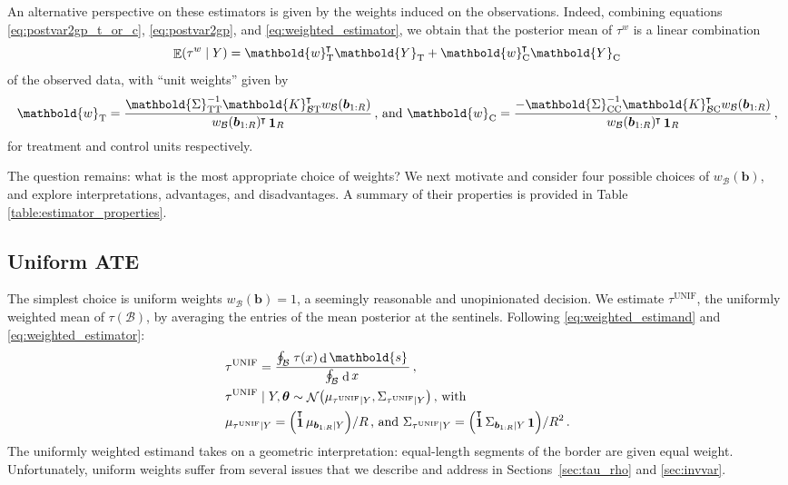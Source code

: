 \documentclass[letter,12pt]{article}
\DeclarePairedDelimiter{\parenthesis}{\lparen}{\rparen}
\newcommand{\del}[1]{\parenthesis*{#1}}
\DeclareMathOperator{\dif}{d}
\DeclareMathOperator{\E}{\mathbb{E}}
\DeclareMathOperator{\normal}{\mathcal{N}}
\DeclareMathOperator{\ones}{\mathbf{1}}
\newcommand*{\trans}{^{\mkern-1.5mu\intercal}}
\newcommand{\treat}{\mathrm{T}}
\newcommand{\ctrol}{\mathrm{C}}
\newcommand{\svec}{\mathbold{s}}
\newcommand{\wvec}{\mathbold{w}}
\newcommand{\Yvec}{\mathbold{Y}}
\newcommand{\yt}{\Yvec_{\treat}}
\newcommand{\yc}{\Yvec_{\ctrol}}
\newcommand{\border}{\mathcal{B}}
\newcommand{\sentinel}{\bm{b}}
\newcommand{\numsent}{R}
\newcommand{\sentinels}{\sentinel_{1:\numsent}}
\newcommand{\tauw}{\tau^{w}}
\newcommand{\unifavg}{\tau^{\mathrm{UNIF}}}
\newcommand{\hyperparam}{\bm{\theta}}
\newcommand{\weightb}{w_{\border}}
\newcommand{\wt}{\wvec_{\treat}}
\newcommand{\wc}{\wvec_{\ctrol}}
\newcommand{\Kmat}{\mathbold{K}}
\newcommand{\SigmaMat}{\mathbold{\Sigma}}
\newcommand{\KBT}{\Kmat_{\border \treat}}
\newcommand{\KBC}{\Kmat_{\border \ctrol}}
\newcommand{\STT}{\SigmaMat_{\treat \treat}}
\newcommand{\SCC}{\SigmaMat_{\ctrol \ctrol}}
\begin{document}
An alternative perspective on these estimators is given by the weights induced on the observations.
Indeed, combining equations \eqref{eq:postvar2gp_t_or_c}, \eqref{eq:postvar2gp}, and \eqref{eq:weighted_estimator}, we obtain that the posterior mean of \(\tauw\) is a linear combination
\begin{equation}
    \E\del{\tauw \mid Y} = \wt\trans \yt + \wc\trans \yc
    \label{eq:unit_weights}
\end{equation}
of the observed data, with ``unit weights'' given by
\begin{equation}
        \wt = \frac{
            \STT^{-1} 
            \KBT\trans \weightb(\sentinels)
        }{
            \weightb(\sentinels)\trans \ones_{\numsent}
        }
        \,\text{, and }
        \wc = \frac{
            -
            \SCC^{-1} 
            \KBC\trans \weightb(\sentinels)
        }{
            \weightb(\sentinels)\trans \ones_{\numsent}
        }
        \,,
    \label{eq:unit_weights_gp}
\end{equation}
for treatment and control units respectively.

The question remains: what is the most appropriate choice of weights? We next motivate and consider four possible choices of \(\weightb(\sentinel)\), and explore interpretations, advantages, and disadvantages. A summary of their properties is provided in Table \ref{table:estimator_properties}.

\hypertarget{uniform-ate}{%
\subsection{Uniform ATE}\label{uniform-ate}}

The simplest choice is uniform weights \(\weightb(\sentinel)=1\), a seemingly reasonable and unopinionated decision.
We estimate \(\unifavg\), the uniformly weighted mean of \(\tau(\border)\), by averaging the entries of the mean posterior at the sentinels.
Following \eqref{eq:weighted_estimand} and \eqref{eq:weighted_estimator}:
\begin{equation}\begin{split}
    &\unifavg = \frac{\oint_\border \left. \tau(x) \dif \svec \right.}
    {\oint_\border \left. \dif x \right.}\,, \\
    &\unifavg \mid Y, \hyperparam \sim \normal\del{\mu_{\unifavg \mid Y}, \Sigma_{\unifavg \mid Y}}\,\text{, with} \\
    &\mu_{\unifavg \mid Y} = \del{\ones\trans \mu_{\sentinels \mid Y}} / \numsent\,\text{, and }
    \Sigma_{\unifavg \mid Y} = \del{\ones\trans \Sigma_{\sentinels \mid Y} \ones} / \numsent^2 \,.
\end{split}
\label{eq:unifavg}
\end{equation}
The uniformly weighted estimand takes on a geometric interpretation: equal-length segments of the border are given equal weight.
Unfortunately, uniform weights suffer from several issues that we describe and address in Sections~\ref{sec:tau_rho} and \ref{sec:invvar}.
\end{document}
